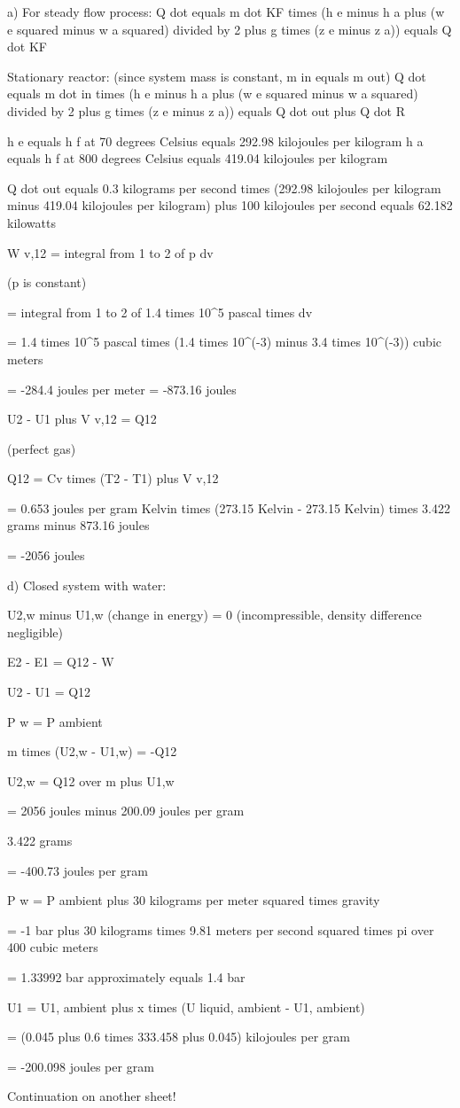 a) For steady flow process:
Q dot equals m dot KF times (h e minus h a plus (w e squared minus w a squared) divided by 2 plus g times (z e minus z a)) equals Q dot KF

Stationary reactor: (since system mass is constant, m in equals m out)
Q dot equals m dot in times (h e minus h a plus (w e squared minus w a squared) divided by 2 plus g times (z e minus z a)) equals Q dot out plus Q dot R

h e equals h f at 70 degrees Celsius equals 292.98 kilojoules per kilogram
h a equals h f at 800 degrees Celsius equals 419.04 kilojoules per kilogram

Q dot out equals 0.3 kilograms per second times (292.98 kilojoules per kilogram minus 419.04 kilojoules per kilogram) plus 100 kilojoules per second equals 62.182 kilowatts

W v,12 = integral from 1 to 2 of p dv

(p is constant)

= integral from 1 to 2 of 1.4 times 10^5 pascal times dv

= 1.4 times 10^5 pascal times (1.4 times 10^(-3) minus 3.4 times 10^(-3)) cubic meters

= -284.4 joules per meter = -873.16 joules

U2 - U1 plus V v,12 = Q12

(perfect gas)

Q12 = Cv times (T2 - T1) plus V v,12

= 0.653 joules per gram Kelvin times (273.15 Kelvin - 273.15 Kelvin) times 3.422 grams minus 873.16 joules

= -2056 joules

d) Closed system with water:

U2,w minus U1,w (change in energy) = 0 (incompressible, density difference negligible)

E2 - E1 = Q12 - W

U2 - U1 = Q12

P w = P ambient

m times (U2,w - U1,w) = -Q12

U2,w = Q12 over m plus U1,w

= 2056 joules minus 200.09 joules per gram

3.422 grams

= -400.73 joules per gram

P w = P ambient plus 30 kilograms per meter squared times gravity

= -1 bar plus 30 kilograms times 9.81 meters per second squared times pi over 400 cubic meters

= 1.33992 bar approximately equals 1.4 bar

U1 = U1, ambient plus x times (U liquid, ambient - U1, ambient)

= (0.045 plus 0.6 times 333.458 plus 0.045) kilojoules per gram

= -200.098 joules per gram

Continuation on another sheet!